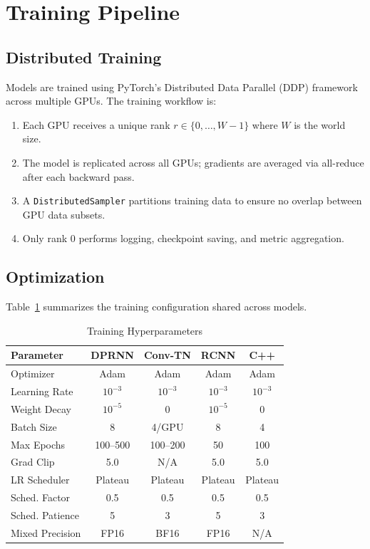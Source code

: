 \documentclass[conference]{IEEEtran}
\begin{document}
\section{Training Pipeline}
\label{sec:training}

\subsection{Distributed Training}

Models are trained using PyTorch's Distributed Data Parallel (DDP) framework across multiple GPUs. The training workflow is:

\begin{enumerate}[leftmargin=*,nosep]
    \item Each GPU receives a unique rank $r \in \{0, \ldots, W{-}1\}$ where $W$ is the world size.
    \item The model is replicated across all GPUs; gradients are averaged via all-reduce after each backward pass.
    \item A \texttt{DistributedSampler} partitions training data to ensure no overlap between GPU data subsets.
    \item Only rank 0 performs logging, checkpoint saving, and metric aggregation.
\end{enumerate}

\subsection{Optimization}

Table~\ref{tab:training_config} summarizes the training configuration shared across models.

\begin{table}[t]
\centering
\caption{Training Hyperparameters}
\label{tab:training_config}
\begin{tabular}{@{}lcccc@{}}
\toprule
\textbf{Parameter} & \textbf{DPRNN} & \textbf{Conv-TN} & \textbf{RCNN} & \textbf{C++} \\
\midrule
Optimizer & Adam & Adam & Adam & Adam \\
Learning Rate & $10^{-3}$ & $10^{-3}$ & $10^{-3}$ & $10^{-3}$ \\
Weight Decay & $10^{-5}$ & 0 & $10^{-5}$ & 0 \\
Batch Size & 8 & 4/GPU & 8 & 4 \\
Max Epochs & 100--500 & 100--200 & 50 & 100 \\
Grad Clip & 5.0 & N/A & 5.0 & 5.0 \\
LR Scheduler & Plateau & Plateau & Plateau & Plateau \\
Sched. Factor & 0.5 & 0.5 & 0.5 & 0.5 \\
Sched. Patience & 5 & 3 & 5 & 3 \\
Mixed Precision & FP16 & BF16 & FP16 & N/A \\
\bottomrule
\end{tabular}
\end{table}
\end{document}
